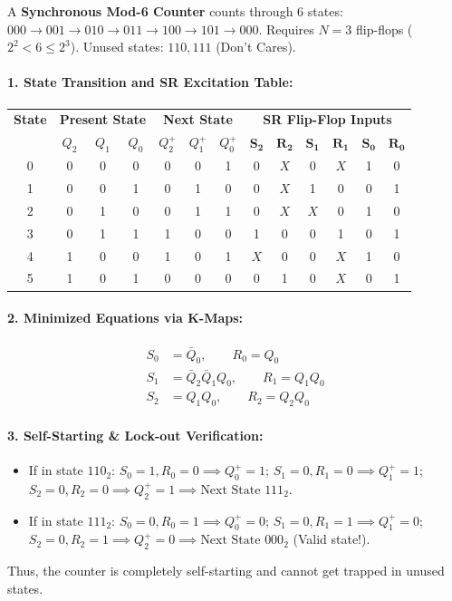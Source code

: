 \documentclass[11pt,a4paper,oneside]{book}
\begin{document}
A \textbf{Synchronous Mod-6 Counter} counts through 6 states: $000 \to 001 \to 010 \to 011 \to 100 \to 101 \to 000$. Requires $N = 3$ flip-flops ($2^2 < 6 \le 2^3$). Unused states: $110, 111$ (Don't Cares).

\paragraph{1. State Transition and SR Excitation Table:}
\begin{center}
\begin{tabular}{|c|ccc|ccc|cccccc|}
\hline
\textbf{State} & \multicolumn{3}{c|}{\textbf{Present State}} & \multicolumn{3}{c|}{\textbf{Next State}} & \multicolumn{6}{c|}{\textbf{SR Flip-Flop Inputs}} \\
& $Q_2$ & $Q_1$ & $Q_0$ & $Q_2^+$ & $Q_1^+$ & $Q_0^+$ & $\mathbf{S_2}$ & $\mathbf{R_2}$ & $\mathbf{S_1}$ & $\mathbf{R_1}$ & $\mathbf{S_0}$ & $\mathbf{R_0}$ \\ \hline
0 & 0 & 0 & 0 & 0 & 0 & 1 & 0 & $X$ & 0 & $X$ & 1 & 0 \\ \hline
1 & 0 & 0 & 1 & 0 & 1 & 0 & 0 & $X$ & 1 & 0 & 0 & 1 \\ \hline
2 & 0 & 1 & 0 & 0 & 1 & 1 & 0 & $X$ & $X$ & 0 & 1 & 0 \\ \hline
3 & 0 & 1 & 1 & 1 & 0 & 0 & 1 & 0 & 0 & 1 & 0 & 1 \\ \hline
4 & 1 & 0 & 0 & 1 & 0 & 1 & $X$ & 0 & 0 & $X$ & 1 & 0 \\ \hline
5 & 1 & 0 & 1 & 0 & 0 & 0 & 0 & 1 & 0 & $X$ & 0 & 1 \\ \hline
\end{tabular}
\end{center}

\paragraph{2. Minimized Equations via K-Maps:}
\begin{align*}
S_0 &= \bar{Q}_0, \qquad R_0 = Q_0 \\
S_1 &= \bar{Q}_2 \bar{Q}_1 Q_0, \qquad R_1 = Q_1 Q_0 \\
S_2 &= Q_1 Q_0, \qquad R_2 = Q_2 Q_0
\end{align*}

\paragraph{3. Self-Starting \& Lock-out Verification:}
\begin{itemize}
  \item If in state $110_2$: $S_0=1, R_0=0 \implies Q_0^+=1$; $S_1=0, R_1=0 \implies Q_1^+=1$; $S_2=0, R_2=0 \implies Q_2^+=1 \implies \text{Next State } 111_2$.
  \item If in state $111_2$: $S_0=0, R_0=1 \implies Q_0^+=0$; $S_1=0, R_1=1 \implies Q_1^+=0$; $S_2=0, R_2=1 \implies Q_2^+=0 \implies \text{Next State } 000_2$ (Valid state!).
\end{itemize}
Thus, the counter is completely self-starting and cannot get trapped in unused states.
\end{document}
